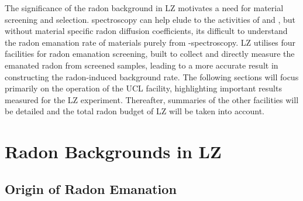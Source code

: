 The significance of the radon background in LZ motivates a need for material screening and selection. \gray{} spectroscopy can help elude to the activities of \UandTe{} and \UandTl{}, but without material specific radon diffusion coefficients, its difficult to understand the radon emanation rate of materials purely from \gamma-spectroscopy. LZ utilises four facilities for radon emanation screening, built to collect and directly measure the emanated radon from screened samples, leading to a more accurate result in constructing the radon-induced background rate. The following sections will focus primarily on the operation of the UCL facility, highlighting important results measured for the LZ experiment. Thereafter, summaries of the other facilities will be detailed and the total radon budget of LZ will be taken into account. 

\section{Radon Backgrounds in LZ}
\label{sec:radon_and_lz}

\subsection{Origin of Radon Emanation}
\label{secsec:radon_origins}

